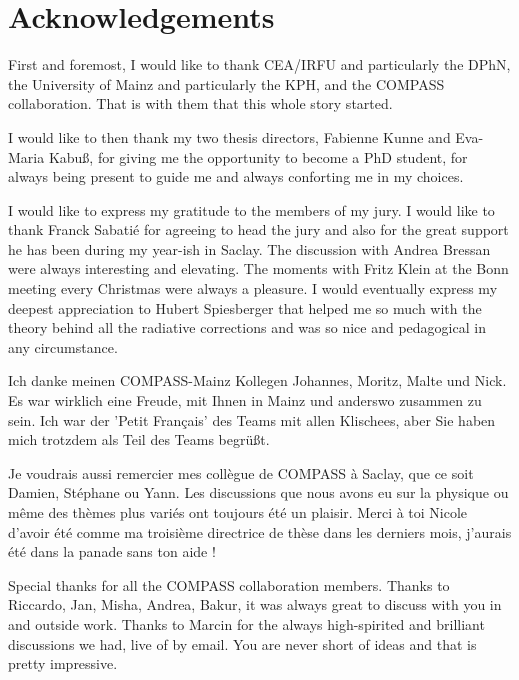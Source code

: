 


\bigskip


\begingroup

\let\clearpage\relax
\let\cleardoublepage\relax
\let\cleardoublepage\relax

\chapter*{Acknowledgements}

First and foremost, I would like to thank CEA/IRFU and particularly the DPhN, the University of Mainz and particularly the KPH, and the COMPASS collaboration. That is with them that this whole story started.

I would like to then thank my two thesis directors, Fabienne Kunne and Eva-Maria Kabuß, for giving me the opportunity to become a PhD student, for always being present to guide me and always conforting me in my choices.

I would like to express my gratitude to the members of my jury. I would like to thank Franck Sabatié for agreeing to head the jury and also for the great support he has been during my year-ish in Saclay. The discussion with Andrea Bressan were always interesting and elevating. The moments with Fritz Klein at the Bonn meeting every Christmas were always a pleasure. I would eventually express my deepest appreciation to Hubert Spiesberger that helped me so much with the theory behind all the radiative corrections and was so nice and pedagogical in any circumstance.

Ich danke meinen COMPASS-Mainz Kollegen Johannes, Moritz, Malte und Nick. Es war wirklich eine Freude, mit Ihnen in Mainz und anderswo zusammen zu sein. Ich war der 'Petit Français' des Teams mit allen Klischees, aber Sie haben mich trotzdem als Teil des Teams begrüßt.

Je voudrais aussi remercier mes collègue de COMPASS à Saclay, que ce soit Damien, Stéphane ou Yann. Les discussions que nous avons eu sur la physique ou même des thèmes plus variés ont toujours été un plaisir. Merci à toi Nicole d'avoir été comme ma troisième directrice de thèse dans les derniers mois, j'aurais été dans la panade sans ton aide !

Special thanks for all the COMPASS collaboration members. Thanks to Riccardo, Jan, Misha, Andrea, Bakur, it was always great to discuss with you in and outside work. Thanks to Marcin for the always high-spirited and brilliant discussions we had, live of by email. You are never short of ideas and that is pretty impressive.

